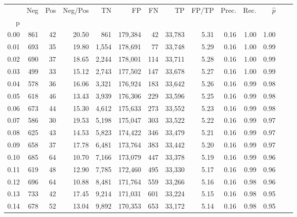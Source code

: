 \begin{tabular}{rrrrrrrrrrrrrr}
\toprule
{} &    Neg &  Pos & Neg/Pos &       TN &       FP &      FN &      TP & FP/TP & Prec. &  Rec. & $\hat{p}$ \\
p    &        &      &         &          &          &         &         &       &       &       &           \\
\midrule
0.00 &    861 &   42 &   20.50 &      861 &  179,384 &      42 &  33,783 &  5.31 &  0.16 &  1.00 &      1.00 \\
0.01 &    693 &   35 &   19.80 &    1,554 &  178,691 &      77 &  33,748 &  5.29 &  0.16 &  1.00 &      0.99 \\
0.02 &    690 &   37 &   18.65 &    2,244 &  178,001 &     114 &  33,711 &  5.28 &  0.16 &  1.00 &      0.99 \\
0.03 &    499 &   33 &   15.12 &    2,743 &  177,502 &     147 &  33,678 &  5.27 &  0.16 &  1.00 &      0.99 \\
0.04 &    578 &   36 &   16.06 &    3,321 &  176,924 &     183 &  33,642 &  5.26 &  0.16 &  0.99 &      0.98 \\
0.05 &    618 &   46 &   13.43 &    3,939 &  176,306 &     229 &  33,596 &  5.25 &  0.16 &  0.99 &      0.98 \\
0.06 &    673 &   44 &   15.30 &    4,612 &  175,633 &     273 &  33,552 &  5.23 &  0.16 &  0.99 &      0.98 \\
0.07 &    586 &   30 &   19.53 &    5,198 &  175,047 &     303 &  33,522 &  5.22 &  0.16 &  0.99 &      0.97 \\
0.08 &    625 &   43 &   14.53 &    5,823 &  174,422 &     346 &  33,479 &  5.21 &  0.16 &  0.99 &      0.97 \\
0.09 &    658 &   37 &   17.78 &    6,481 &  173,764 &     383 &  33,442 &  5.20 &  0.16 &  0.99 &      0.97 \\
0.10 &    685 &   64 &   10.70 &    7,166 &  173,079 &     447 &  33,378 &  5.19 &  0.16 &  0.99 &      0.96 \\
0.11 &    619 &   48 &   12.90 &    7,785 &  172,460 &     495 &  33,330 &  5.17 &  0.16 &  0.99 &      0.96 \\
0.12 &    696 &   64 &   10.88 &    8,481 &  171,764 &     559 &  33,266 &  5.16 &  0.16 &  0.98 &      0.96 \\
0.13 &    733 &   42 &   17.45 &    9,214 &  171,031 &     601 &  33,224 &  5.15 &  0.16 &  0.98 &      0.95 \\
0.14 &    678 &   52 &   13.04 &    9,892 &  170,353 &     653 &  33,172 &  5.14 &  0.16 &  0.98 &      0.95 \\

\end{tabular}
